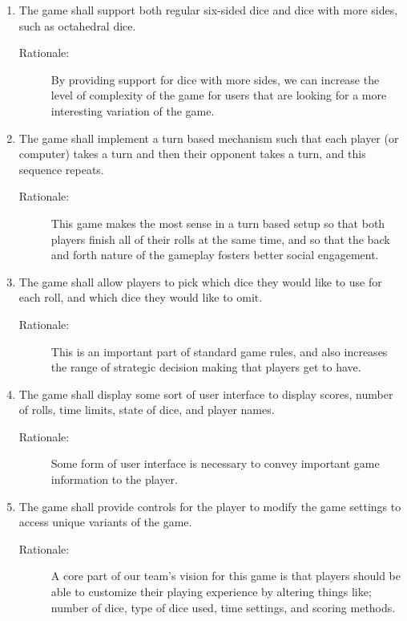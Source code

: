 \begin{enumerate}[label=R\arabic*, start=1, left=0pt]
    \item The game shall support both regular six-sided dice and dice with more sides, such as octahedral dice.
    \begin{description}
        \item[Rationale:] By providing support for dice with more sides, we can increase the level of complexity of the game for users that are looking for a more interesting variation of the game.
    \end{description}

    \item The game shall implement a turn based mechanism such that each player (or computer) takes a turn and then their opponent takes a turn, and this sequence repeats.
    \begin{description}
        \item[Rationale:] This game makes the most sense in a turn based setup so that both players finish all of their rolls at the same time, and so that the back and forth nature of the gameplay fosters better social engagement.
    \end{description}

    \item The game shall allow players to pick which dice they would like to use for each roll, and which dice they would like to omit.
    \begin{description}
        \item[Rationale:] This is an important part of standard game rules, and also increases the range of strategic decision making that players get to have.
    \end{description}

    \item The game shall display some sort of user interface to display scores, number of rolls, time limits, state of dice, and player names.
    \begin{description}
        \item[Rationale:] Some form of user interface is necessary to convey important game information to the player.
    \end{description}

    \item The game shall provide controls for the player to modify the game settings to access unique variants of the game.
    \begin{description}
        \item[Rationale:] A core part of our team's vision for this game is that players should be able to customize their playing experience by altering things like; number of dice, type of dice used, time settings, and scoring methods.
    \end{description}


\end{enumerate}
